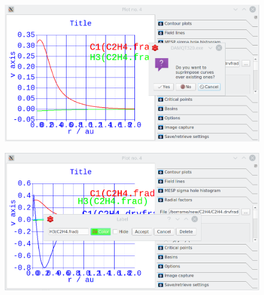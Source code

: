 \documentclass[a4paper,10pt]{article}
\begin{document}
\begin{minipage}{.5\linewidth}
\begin{figure}[H]
\caption{\label{fig:33}}
\begin{center}
\includegraphics[width=0.95\linewidth]{damqt_QS_fig33.png}
\end{center}
\end{figure} 
\end{minipage}
\begin{minipage}{.5\linewidth}
\begin{figure}[H]
\caption{\label{fig:34}}
\begin{center}
\includegraphics[width=0.95\linewidth]{damqt_QS_fig34.png}
\end{center}
\end{figure} 
\end{minipage}
\end{document}
